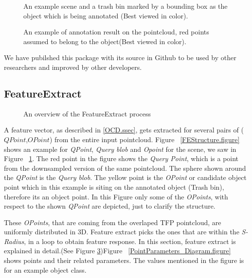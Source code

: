 \begin{figure}[t]
  \caption[Example scene and object for Annotation tool]
  {An example scene and a trash bin marked by a bounding box as the object which is being annotated (Best viewed in color).}
  \label{TrashbinBounding.figure}
\end{figure}

\begin{figure}[t]
  \caption[Annotation tool result]
  {An example of annotation result on the pointcloud, red points assumed to belong to the object(Best viewed in color).}
  \label{Annotation.figure}
\end{figure}

We have pubilshed this package with its source in Github to be used by other researchers and improved by other developers.\cite{AnnotationGithub}



\subsection{FeatureExtract}
\label{FeatureExtract.ssec}

\begin{figure}[t]
  \caption[FeatureExtract overview]
  {An overview of the FeatureExtract process}
  \label{FeatureExtractFlowchart.figure}
\end{figure}


A feature vector, as described in \ref{OCD.ssec}, gets extracted for several pairs of ($QPoint$,$OPoint$) from the entire input pointcloud. 
Figure ~\ref{FEStructure.figure} shows an example for {\it QPoint}, {\it Query blob} and {\it Opoint} for the scene, we saw in Figure 
 ~\ref{TrashbinBounding.figure}. The red point in the figure shows the {\it Query Point}, which is a point from the downsampled version of the same pointcloud. The sphere shown around the {\it QPoint} is the {\it Query blob}. The yellow point is the {\it OPoint} or candidate object point which in this example is siting on the annotated object (Trash bin), therefore its an object point. In this Figure only some of the {\it OPoints}, with respect to the shown {\it QPoint} are depicted, just to clarify the structure. 
 
 
 These {\it OPoints}, that are coming from the overlaped TFP pointcloud, are uniformly distributed in 3D. Feature extract picks the ones that are within the {\it S-Radius}, in a loop to obtain feature response. In this section, feature extract is explained in detail.(See Figure \ref{FeatureExtractFlowchart.figure})Figure ~\ref{PointParameters_Diagram.figure} shows points and their related parameters. 
The values mentioned in the figure is for an example object class.
 
